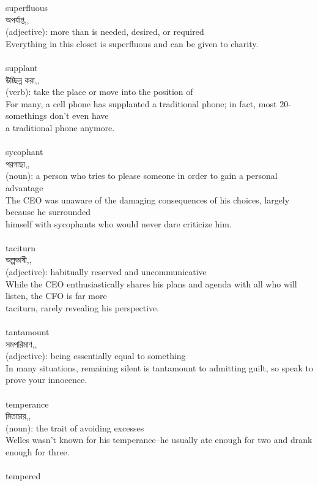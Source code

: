 \documentclass{article}
\begin{document}
{superfluous}\\
{অপর্যাপ্ত,,}\\
{(adjective): more than is needed, desired, or required\\Everything in this closet is superfluous and can be given to charity.\\}\\
{supplant}\\
{উচ্ছিন্ন করা,,}\\
{(verb): take the place or move into the position of\\For many, a cell phone has supplanted a traditional phone; in fact, most 20-somethings don't even have\\a traditional phone anymore.\\}\\
{sycophant}\\
{পরগাছা,,}\\
{(noun): a person who tries to please someone in order to gain a personal advantage\\The CEO was unaware of the damaging consequences of his choices, largely because he surrounded\\himself with sycophants who would never dare criticize him.\\}\\
{taciturn}\\
{অল্পভাষী,,}\\
{(adjective): habitually reserved and uncommunicative\\While the CEO enthusiastically shares his plans and agenda with all who will listen, the CFO is far more\\taciturn, rarely revealing his perspective.\\}\\
{tantamount}\\
{সমপরিমাণ,,}\\
{(adjective): being essentially equal to something\\In many situations, remaining silent is tantamount to admitting guilt, so speak to prove your innocence.\\}\\
{temperance}\\
{মিতাচার,,}\\
{(noun): the trait of avoiding excesses\\Welles wasn't known for his temperance--he usually ate enough for two and drank enough for three.\\}\\
{tempered}\\
\end{document}
